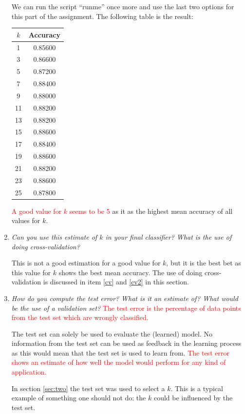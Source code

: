 \documentclass[a4paper,11pt]{article}
\newcommand{\highlightColor}{red}
\begin{document}
\begin{enumerate}
We can run the script ``runme'' once more and use the last two options for 
this part of the assignment.  The following table is the result:

\begin{tabular}{c | c}
\textbf{$k$} & \textbf{Accuracy} \\
\hline
1 &  0.85600\\ 
3 &  0.86600\\ 
5 &  0.87200\\ 
7 &  0.88400\\ 
9 &  0.88000\\ 
11&  0.88200\\ 
13&  0.88200\\ 
15&  0.88600\\ 
17&  0.88400\\ 
19&  0.88600\\ 
21&  0.88200\\ 
23&  0.88600\\ 
25&  0.87800\\ 
\end{tabular}

\textcolor{\highlightColor}{A good value for $k$ seems to be 5} as it as the highest mean accuracy of all
values for $k$. 

\item \textit{Can you use this estimate of $k$ in your final classifier? What is the use of doing cross-validation?}

This is not a good estimation for a good value for $k$, but it is the best 
bet as this value for $k$ shows the best mean accuracy. The use of doing 
cross-validation is discussed in item \ref{cv} and \ref{cv2} in this section. 

\item \textit{ How do you compute the test error? What is it an estimate of? What would be the use of a validation
set? } 
\label{cv2}
\textcolor{\highlightColor}{The test error is the percentage of data points from the test set which 
are wrongly classified.}

The test set can solely be used to evaluate the (learned) model. No
information from the test set can be used as feedback in the learning 
process as this would mean that the test set is used to learn from. 
\textcolor{\highlightColor}{The 
test error shows an estimate of how well the model would perform for
any kind of application.}

In section \ref{sec:two} the test set was used to select a $k$. This is a
typical example of something one should not do: the $k$ could be influenced
by the test set. 


\end{enumerate}
\end{document}
